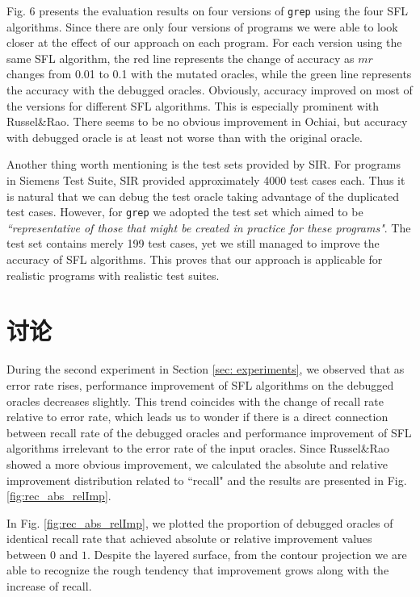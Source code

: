 Fig. 6 %
presents the evaluation results on four versions of \texttt{grep} using the four SFL algorithms. Since there are only four versions of programs we were able to look closer at the effect of our approach on each program. For each version using the same SFL algorithm, the red line represents the change of accuracy as $mr$ changes from 0.01 to 0.1 with the mutated oracles, while the green line represents the accuracy with the debugged oracles. Obviously, accuracy improved on most of the versions for different SFL algorithms. This is especially prominent with Russel\&Rao. There seems to be no obvious improvement in Ochiai, but accuracy with debugged oracle is at least not worse than with the original oracle.

Another thing worth mentioning is the test sets provided by SIR. For programs in Siemens Test Suite, SIR provided approximately 4000 test cases each. Thus it is natural that we can debug the test oracle taking advantage of the duplicated test cases. However, for \texttt{grep} we adopted the test set which aimed to be \textit{``representative of those that might be created in practice for these programs"}\cite{doESE05}. The test set contains merely 199 test cases, yet we still managed to improve the accuracy of SFL algorithms. This proves that our approach is applicable for realistic programs with realistic test suites.

\section{讨论}

During the second experiment in Section \ref{sec: experiments}, we observed that as error rate rises, performance improvement of SFL algorithms on the debugged oracles decreases slightly. This trend coincides with the change of recall rate relative to error rate, which leads us to wonder if there is a direct connection between recall rate of the debugged oracles and performance improvement of SFL algorithms irrelevant to the error rate of the input oracles. Since Russel\&Rao showed a more obvious improvement, we calculated the absolute and relative improvement distribution related to ``recall" and the results are presented in Fig. \ref{fig:rec_abs_relImp}.

In Fig. \ref{fig:rec_abs_relImp}, we plotted the proportion of debugged oracles of identical recall rate that achieved absolute or relative improvement values between $0$ and $1$. Despite the layered surface, from the contour projection we are able to recognize the rough tendency that improvement grows along with the increase of recall.

